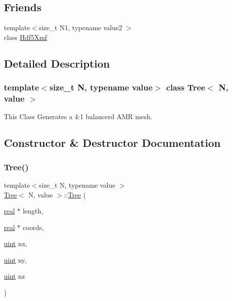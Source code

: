 \subsection*{Friends}
\begin{DoxyCompactItemize}
\item 
{\footnotesize template$<$size\+\_\+t N1, typename value2 $>$ }\\class \mbox{\hyperlink{classTree_ab87a301be23011123f58ee948a55b2d9}{Hdf5\+Xmf}}
\end{DoxyCompactItemize}


\subsection{Detailed Description}
\subsubsection*{template$<$size\+\_\+t N, typename value$>$\newline
class Tree$<$ N, value $>$}

This Class Generates a 4\+:1 balancerd A\+MR mesh. 

\subsection{Constructor \& Destructor Documentation}
\mbox{\label{classTree_afd632b8d5a32c34865a305830558e256}} 
\subsubsection{\texorpdfstring{Tree()}{Tree()}\hspace{0.1cm}{\footnotesize\ttfamily [1/3]}}
{\footnotesize\ttfamily template$<$size\+\_\+t N, typename value $>$ \\
\mbox{\hyperlink{classTree}{Tree}}$<$ N, value $>$\+::\mbox{\hyperlink{classTree}{Tree}} (\begin{DoxyParamCaption}\item[{\mbox{\hyperlink{definitions_8h_aedc0ad84d1e764530814f57ad931d02a}{real}} $\ast$}]{length,  }\item[{\mbox{\hyperlink{definitions_8h_aedc0ad84d1e764530814f57ad931d02a}{real}} $\ast$}]{coords,  }\item[{\mbox{\hyperlink{definitions_8h_a69aa29b598b851b0640aa225a9e5d61d}{uint}}}]{nx,  }\item[{\mbox{\hyperlink{definitions_8h_a69aa29b598b851b0640aa225a9e5d61d}{uint}}}]{ny,  }\item[{\mbox{\hyperlink{definitions_8h_a69aa29b598b851b0640aa225a9e5d61d}{uint}}}]{nz }\end{DoxyParamCaption})}


